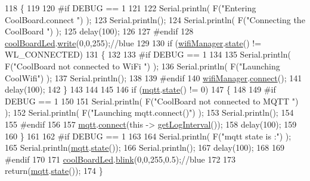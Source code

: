 \begin{DoxyCode}
118 \{
119 
120 \textcolor{preprocessor}{#if DEBUG == 1  }
121 
122     Serial.println( F(\textcolor{stringliteral}{"Entering CoolBoard.connect "}) );
123     Serial.println();
124     Serial.println( F(\textcolor{stringliteral}{"Connecting the CoolBoard  "}) );
125     delay(100);
126 
127 \textcolor{preprocessor}{#endif}
128     \hyperlink{classCoolBoard_a1b1d3c684a5baa56b08486e192fd8e97}{coolBoardLed}.\hyperlink{classCoolBoardLed_a30fadd4cbec17ceea428bf7a32207e87}{write}(0,0,255);\textcolor{comment}{//blue}
129 
130     \textcolor{keywordflow}{if} (\hyperlink{classCoolBoard_acd88e6003606b47479ebba81e4aceeca}{wifiManager}.\hyperlink{classCoolWifi_a1c7b4d82a4098d346e7593dce92039fa}{state}() != WL\_CONNECTED)
131     \{       
132     
133 \textcolor{preprocessor}{    #if DEBUG == 1      }
134 
135         Serial.println( F(\textcolor{stringliteral}{"CoolBoard not connected to WiFi "}) );
136         Serial.println( F(\textcolor{stringliteral}{"Launching CoolWifi"}) );
137         Serial.println();
138 
139 \textcolor{preprocessor}{    #endif}
140         \hyperlink{classCoolBoard_acd88e6003606b47479ebba81e4aceeca}{wifiManager}.\hyperlink{classCoolWifi_ad060353050f40d032a2dbf9e54a768bf}{connect}();
141         delay(100);
142     \}
143 
144 
145     
146     \textcolor{keywordflow}{if} (\hyperlink{classCoolBoard_a2399f44d7c23c1149a335cb3b46d90f1}{mqtt}.\hyperlink{classCoolMQTT_a5d003307eff78efbd585e42b43b72b6d}{state}() != 0)
147     \{   
148     
149 \textcolor{preprocessor}{    #if DEBUG == 1  }
150     
151         Serial.println( F(\textcolor{stringliteral}{"CoolBoard not connected to MQTT "}) );
152         Serial.println( F(\textcolor{stringliteral}{"Launching mqtt.connect()"}) );
153         Serial.println();
154 
155 \textcolor{preprocessor}{    #endif  }
156     
157         \hyperlink{classCoolBoard_a2399f44d7c23c1149a335cb3b46d90f1}{mqtt}.\hyperlink{classCoolMQTT_a58b0b1f64b269c2681685208262fba1d}{connect}(\textcolor{keyword}{this} -> \hyperlink{classCoolBoard_aaa24480b273fc095a1356a589c333781}{getLogInterval}());
158         delay(100);
159         
160     \}
161     
162 \textcolor{preprocessor}{#if DEBUG == 1}
163 
164     Serial.println( F(\textcolor{stringliteral}{"mqtt state is :"}) );
165     Serial.println(\hyperlink{classCoolBoard_a2399f44d7c23c1149a335cb3b46d90f1}{mqtt}.\hyperlink{classCoolMQTT_a5d003307eff78efbd585e42b43b72b6d}{state}());
166     Serial.println();
167     delay(100);
168 
169 \textcolor{preprocessor}{#endif}
170 
171     \hyperlink{classCoolBoard_a1b1d3c684a5baa56b08486e192fd8e97}{coolBoardLed}.\hyperlink{classCoolBoardLed_a96e1ea13003eee34c9dbcef340404426}{blink}(0,0,255,0.5);\textcolor{comment}{//blue}
172 
173     \textcolor{keywordflow}{return}(\hyperlink{classCoolBoard_a2399f44d7c23c1149a335cb3b46d90f1}{mqtt}.\hyperlink{classCoolMQTT_a5d003307eff78efbd585e42b43b72b6d}{state}());
174 \}
\end{DoxyCode}
